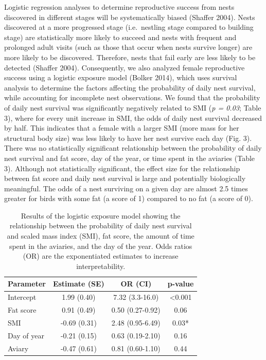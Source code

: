 \documentclass[
]{article}
\begin{document}
Logistic regression analyses to determine reproductive success from
nests discovered in different stages will be systematically biased
(Shaffer 2004). Nests discovered at a more progressed stage
(i.e.~nestling stage compared to building stage) are statistically more
likely to succeed and nests with frequent and prolonged adult visits
(such as those that occur when nests survive longer) are more likely to
be discovered. Therefore, nests that fail early are less likely to be
detected (Shaffer 2004). Consequently, we also analyzed female
reproductive success using a logistic exposure model (Bolker 2014),
which uses survival analysis to determine the factors affecting the
probability of daily nest survival, while accounting for incomplete nest
observations. We found that the probability of daily nest survival was
significantly negatively related to SMI (\emph{p = 0.03}; Table 3),
where for every unit increase in SMI, the odds of daily nest survival
decreased by half. This indicates that a female with a larger SMI (more
mass for her structural body size) was less likely to have her nest
survive each day (Fig. 3). There was no statistically significant
relationship between the probability of daily nest survival and fat
score, day of the year, or time spent in the aviaries (Table 3).
Although not statistically significant, the effect size for the
relationship between fat score and daily nest survival is large and
potentially biologically meaningful. The odds of a nest surviving on a
given day are almost 2.5 times greater for birds with some fat (a score
of 1) compared to no fat (a score of 0).

\begin{table}

\caption{\label{tab:logexp}Results of the logistic exposure model showing the relationship between the probability of daily nest survival and scaled mass index (SMI), fat score, the amount of time spent in the aviaries, and the day of the year. Odds ratios (OR) are the exponentiated estimates to increase interpretability.}
\centering
\begin{tabular}[t]{l|c|c|c}
\hline
Parameter & Estimate (SE) & OR (CI) & p-value\\
\hline
Intercept & 1.99 (0.40) & 7.32 (3.3-16.0) & <0.001\\
\hline
Fat score & 0.91 (0.49) & 0.50 (0.27-0.92) & 0.06\\
\hline
SMI & -0.69 (0.31) & 2.48 (0.95-6.49) & 0.03*\\
\hline
Day of year & -0.21 (0.15) & 0.63 (0.19-2.10) & 0.16\\
\hline
Aviary & -0.47 (0.61) & 0.81 (0.60-1.10) & 0.44\\
\hline
\end{tabular}
\end{table}
\end{document}
